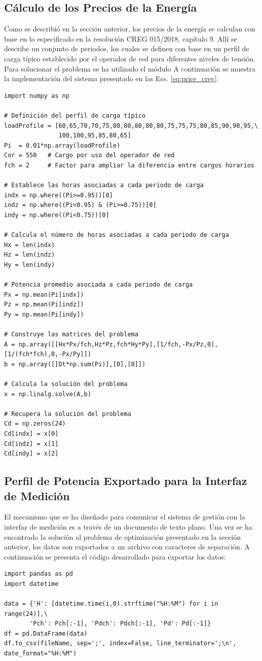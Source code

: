 \subsection{Cálculo de los Precios de la Energía}\label{sec:creg}
Como se describió en la sección anterior, los precios de la energía se calculan con base en lo especificado en la resolución CREG 015/2018, capítulo 9. Allí se describe un conjunto de periodos, los cuales se definen con base en un perfil de carga típico establecido por el operador de red para diferentes niveles de tensión. Para solucionar el problema se ha utilizado el módulo  A continuación se muestra la implementación del sistema presentado en las Ecs. \eqref{eq:price_creg}:

\begin{verbatim}
import numpy as np

# Definición del perfil de carga típico
loadProfile = [60,65,70,70,75,80,80,80,80,80,75,75,75,80,85,90,90,95,\
               100,100,95,85,80,65]
Pi  = 0.01*np.array(loadProfile)
Cor = 550   # Cargo por uso del operador de red
fch = 2     # Factor para ampliar la diferencia entre cargos horarios

# Establece las horas asociadas a cada periodo de carga
indx = np.where((Pi>=0.95))[0]
indz = np.where((Pi<0.95) & (Pi>=0.75))[0]
indy = np.where((Pi<0.75))[0]

# Calcula el número de horas asociadas a cada periodo de carga
Hx = len(indx)
Hz = len(indz)
Hy = len(indy)

# Potencia promedio asociada a cada periodo de carga
Px = np.mean(Pi[indx])
Pz = np.mean(Pi[indz])
Py = np.mean(Pi[indy])

# Construye las matrices del problema
A = np.array([[Hx*Px/fch,Hz*Pz,fch*Hy*Py],[1/fch,-Px/Pz,0],[1/(fch*fch),0,-Px/Py]])
b = np.array([[Dt*np.sum(Pi)],[0],[0]])

# Calcula la solución del problema
x = np.linalg.solve(A,b)

# Recupera la solución del problema
Cd = np.zeros(24)
Cd[indx] = x[0]
Cd[indz] = x[1]
Cd[indy] = x[2]
\end{verbatim}

\subsection{Perfil de Potencia Exportado para la Interfaz de Medición}\label{sec:exportarDatos}
El mecanismo que se ha diseñado para comunicar el sistema de gestión con la interfaz de medición es a través de un documento de texto plano.
Una vez se ha encontrado la solución al problema de optimización presentado en la sección anterior, los datos son exportados a un archivo con caracteres de separación. A continuación se presenta el código desarrollado para exportar los datos:
\begin{verbatim}
import pandas as pd
import datetime

data = {'H': [datetime.time(i,0).strftime("%H:%M") for i in range(24)],\
       'Pch': Pch[:-1], 'Pdch': Pdch[:-1], 'Pd': Pd[:-1]}
df = pd.DataFrame(data)
df.to_csv(fileName, sep=';', index=False, line_terminator=';\n', date_format="%H:%M")
\end{verbatim}

